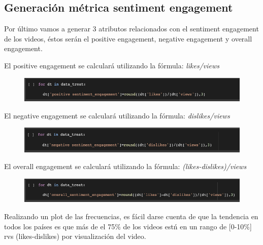 \documentclass[a4paper,12pt]{article}
\begin{document}
\subsection{Generaci\'on m\'etrica sentiment engagement}
Por \'ultimo vamos a generar 3 atributos relacionados con el sentiment engagement de los videos, \'estos ser\'an el positive engagement, negative engagement y overall engagement.

El positive engagement se calcular\'a utilizando la f\'ormula: {\itshape likes/views}

\begin{figure}[h!]
\centering
\includegraphics[width=13cm]{pos_eng_gen.png}
\end{figure}

El negative engagement se calcular\'a utilizando la f\'ormula: {\itshape dislikes/views}

\begin{figure}[h!]
\centering
\includegraphics[width=13cm]{neg_eng_gen.png}
\end{figure}

El overall engagement se calcular\'a utilizando la f\'ormula: {\itshape (likes-dislikes)/views}

\begin{figure}[h!]
\centering
\includegraphics[width=13cm]{ove_eng_gen.png}
\end{figure}

Realizando un plot de las frecuencias, es f\'acil darse cuenta de que la tendencia en todos los pa\'ises es que m\'as de el 75\% de los videos est\'n en un rango de [0-10\%] rvs (likes-dislikes) por visualizaci\'on del video.
\end{document}
